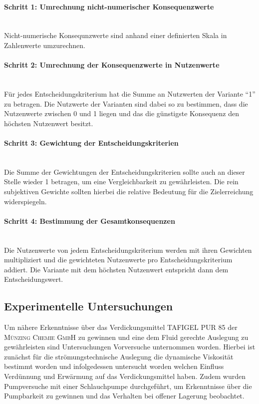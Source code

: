 \paragraph{Schritt 1: Umrechnung nicht-numerischer Konsequenzwerte}	\, \\
Nicht-numerische Konsequnzwerte sind anhand einer definierten Skala in Zahlenwerte umzurechnen.
\vspace*{-2.5mm}
\paragraph{Schritt 2: Umrechnung der Konsequenzwerte in Nutzenwerte} \, \\ 
Für jedes Entscheidungskriterium hat die Summe an Nutzwerten der Variante "`1"' zu betragen. Die Nutzwerte der Varianten sind dabei so zu bestimmen, dass die Nutzenwerte zwischen $0$ und 1 liegen und das die günstigste Konsequenz den höchsten Nutzenwert besitzt.
\vspace*{-2.5mm}
\paragraph{Schritt 3: Gewichtung der Entscheidungskriterien} \, \\
Die Summe der Gewichtungen der Entscheidungskriterien sollte auch an dieser Stelle wieder 1 betragen, um eine Vergleichbarkeit zu gewährleisten. Die rein subjektiven Gewichte sollten hierbei die relative Bedeutung für die Zielerreichung widerspiegeln.
\vspace*{-7.5mm}
\paragraph{Schritt 4: Bestimmung der Gesamtkonsequenzen} \, \\
Die Nutzenwerte von jedem Entscheidungskriterium werden mit ihren Gewichten multipliziert und die gewichteten Nutzenwerte pro Entscheidungskriterium addiert. Die Variante mit dem höchsten Nutzenwert entspricht dann dem Entscheidungswert.


\subsection{Experimentelle Untersuchungen}
Um nähere Erkenntnisse über das Verdickungsmittel TAFIGEL PUR 85 der \textsc{Münzing Chemie GmbH} zu gewinnen und eine dem Fluid gerechte Auslegung zu gewährleisten sind Untersuchungen Vorversuche unternommen worden. Hierbei ist zunächst für die strömungstechnische Auslegung die dynamische Viskosität bestimmt worden und infolgedessen untersucht worden welchen Einfluss Verdünnung und Erwärmung auf das Verdickungsmittel haben. Zudem wurden Pumpversuche mit einer Schlauchpumpe durchgeführt, um Erkenntnisse über die Pumpbarkeit zu gewinnen und das Verhalten bei offener Lagerung beobachtet.

